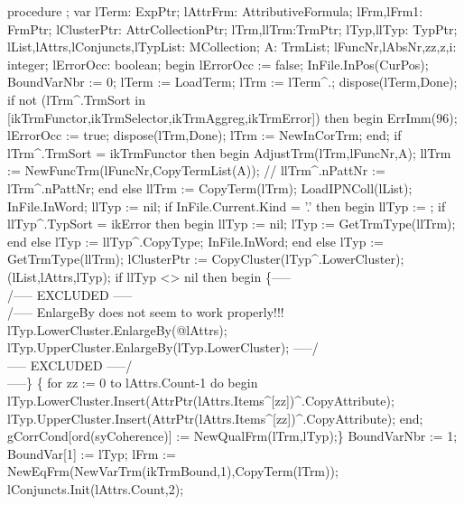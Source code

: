 \nwenddocs{}\endmoddef\nwstartdeflinemarkup{}\nwenddeflinemarkup
procedure ;
var
   lTerm: ExpPtr;
   lAttrFrm: AttributiveFormula;
   lFrm,lFrm1: FrmPtr;
   lClusterPtr: AttrCollectionPtr;
   lTrm,llTrm:TrmPtr;
   lTyp,llTyp: TypPtr;
   lList,lAttrs,lConjuncts,lTypList: MCollection;
   A: TrmList;
   lFuncNr,lAbsNr,zz,z,i: integer;
   lErrorOcc: boolean;
begin
   lErrorOcc := false;
   InFile.InPos(CurPos); BoundVarNbr := 0;
   lTerm := LoadTerm;
   lTrm := lTerm^.;
   dispose(lTerm,Done);
   if not (lTrm^.TrmSort in [ikTrmFunctor,ikTrmSelector,ikTrmAggreg,ikTrmError]) then
   begin
      ErrImm(96);
      lErrorOcc := true;
      dispose(lTrm,Done);
      lTrm := NewInCorTrm;
   end;
   if lTrm^.TrmSort = ikTrmFunctor then
   begin
      AdjustTrm(lTrm,lFuncNr,A);
      llTrm := NewFuncTrm(lFuncNr,CopyTermList(A));
      //   llTrm^.nPattNr := lTrm^.nPattNr;
   end
   else llTrm := CopyTerm(lTrm);
   LoadIPNColl(lList);
   InFile.InWord;
   llTyp := nil;
   if InFile.Current.Kind = '.' then
   begin
      llTyp := ;
      if llTyp^.TypSort = ikError then
      begin
         llTyp := nil;
         lTyp := GetTrmType(llTrm);
      end
      else lTyp := llTyp^.CopyType;
      InFile.InWord;
   end
   else lTyp := GetTrmType(llTrm);
   lClusterPtr := CopyCluster(lTyp^.LowerCluster);
   (lList,lAttrs,lTyp);
   if llTyp <> nil then
   begin
\{-----\\/----- EXCLUDED -----\\/----- EnlargeBy does not seem to work properly!!!
   lTyp.LowerCluster.EnlargeBy(@lAttrs);
   lTyp.UpperCluster.EnlargeBy(lTyp.LowerCluster);
 -----/\\----- EXCLUDED -----/\\-----\}
\{    for zz := 0 to lAttrs.Count-1 do
       begin
          lTyp.LowerCluster.Insert(AttrPtr(lAttrs.Items^[zz])^.CopyAttribute);
          lTyp.UpperCluster.Insert(AttrPtr(lAttrs.Items^[zz])^.CopyAttribute);
       end;
   gCorrCond[ord(syCoherence)] := NewQualFrm(lTrm,lTyp);\}
      BoundVarNbr := 1;
      BoundVar[1] := lTyp;
      lFrm := NewEqFrm(NewVarTrm(ikTrmBound,1),CopyTerm(lTrm));
      lConjuncts.Init(lAttrs.Count,2);
